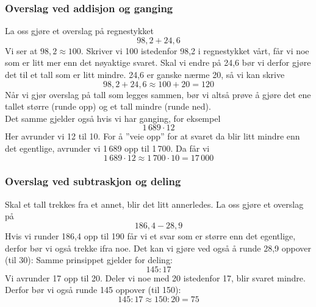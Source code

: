 
\subsubsection{Overslag ved addisjon og ganging}
La oss gjøre et overslag på regnestykket
\[ 98,2+24,6 \]
Vi ser at $ 98,2 \approx 100 $. Skriver vi 100 istedenfor 98,2 i regnestykket vårt, får vi noe som er litt mer enn det nøyaktige svaret. Skal vi endre på 24,6 bør vi derfor gjøre det til et tall som er litt mindre. 24,6 er ganske nærme 20, så vi kan skrive
\[ 98,2+24,6 \approx 100 + 20 = 120 \]
Når vi gjør overslag på tall som legges sammen, bør vi altså prøve å gjøre det ene tallet større (runde opp) og et tall mindre (runde ned).\\

\linje
Det samme gjelder også hvis vi har ganging, for eksempel
\[ 1\,689\cdot12 \]
Her avrunder vi 12 til 10. For å ''veie opp'' for at svaret da blir litt mindre enn det egentlige, avrunder vi 1\,689 opp til 1\,700. Da får vi
\[ 1\,689\cdot12\approx 1\,700\cdot 10 =17\,000 \]
\subsubsection{Overslag ved subtraskjon og deling}
Skal et tall trekkes fra et annet, blir det litt annerledes. La oss gjøre et overslag på
\[ 186,4-28,9 \]
Hvis vi runder 186,4 opp til 190 får vi et svar som er større enn det egentlige, derfor bør vi også trekke ifra noe. Det kan vi gjøre ved også å runde 28,9 oppover (til 30):
Samme prinsippet gjelder for deling: 
\[ 145:17 \]
Vi avrunder 17 opp til 20. Deler vi noe med 20 istedenfor 17, blir svaret mindre. Derfor bør vi også runde 145 oppover (til 150):
\[ 145:17 \approx 150:20 = 75 \]


